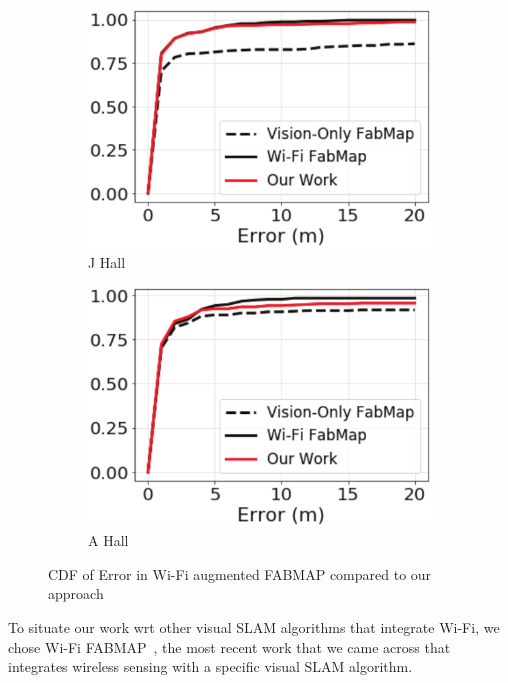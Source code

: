 \begin{figure}
\begin{subfigure}[b]{0.24\textwidth}
		\includegraphics[width=\textwidth]{Figure10_c.eps}
		\caption{J Hall}
	\end{subfigure}
	\begin{subfigure}[b]{0.24\textwidth}
		\includegraphics[width=\textwidth]{Figure10_d.eps}
		\caption{A Hall}
	\end{subfigure}
\caption{CDF of Error in Wi-Fi augmented FABMAP compared to our approach}
\label{fabmap}
\end{figure}
To situate our work wrt other visual SLAM algorithms that integrate Wi-Fi, we chose Wi-Fi FABMAP~\cite{visual_wifi_2}, the most recent work
that we came across that integrates wireless sensing with a specific visual SLAM algorithm. 

